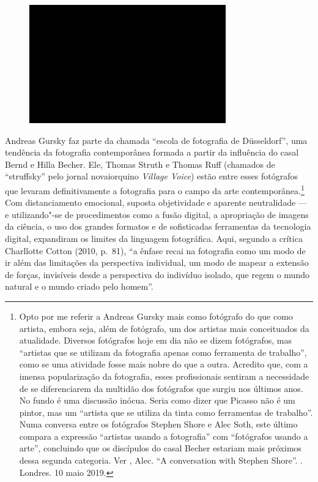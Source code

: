 \begin{figure}[!ht]

\centering
 \includegraphics[width=85mm]{./imgs/im1.jpg}
\caption{\tiny{}}

\end{figure}

Andreas Gursky faz parte da chamada ``escola de fotografia de
Düsseldorf'', uma tendência da fotografia contemporânea formada a partir
da influência do casal Bernd e Hilla Becher. Ele, Thomas Struth e Thomas
Ruff (chamados de ``struffsky'' pelo jornal novaiorquino \emph{Village
Voice}) estão entre esses fotógrafos que levaram definitivamente a
fotografia para o campo da arte contemporânea.\footnote{Opto por me \label{ferramenta}
  referir a Andreas Gursky mais como fotógrafo do que como artista,
  embora seja, além de fotógrafo, um dos artistas mais conceituados da
  atualidade. Diversos fotógrafos hoje em dia não se dizem fotógrafos,
  mas ``artistas que se utilizam da fotografia apenas como ferramenta de
  trabalho'', como se uma atividade fosse mais nobre do que a outra.
  Acredito que, com a imensa popularização da fotografia, esses
  profissionais sentiram a necessidade de se diferenciarem da multidão
  dos fotógrafos que surgiu nos últimos anos. No fundo é uma discussão
  inócua. Seria como dizer que Picasso não é um pintor, mas um ``artista
  que se utiliza da tinta como ferramentas de trabalho''. Numa conversa
  entre os fotógrafos Stephen Shore e Alec Soth, este último compara a
  expressão ``artistas usando a fotografia'' com ``fotógrafos usando a
  arte'', concluindo que os discípulos do casal Becher estariam mais
  próximos dessa segunda categoria. Ver , Alec. ``A conversation with
  Stephen Shore''. {}. Londres. 10 maio 2019.} Com
distanciamento emocional, suposta objetividade e aparente neutralidade
--- e utilizando"-se de procedimentos como a fusão digital, a apropriação
de imagens da ciência, o uso dos grandes formatos e de sofisticadas
ferramentas da tecnologia digital, expandiram os limites da linguagem
fotográfica. Aqui, segundo a crítica Charllotte Cotton (2010, p.~81),
``a ênfase recai na fotografia como um modo de ir além das limitações da
perspectiva individual, um modo de mapear a extensão de forças,
invisíveis desde a perspectiva do indivíduo isolado, que regem o mundo
natural e o mundo criado pelo homem''.

